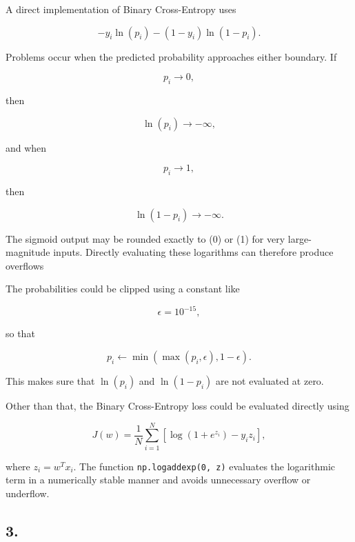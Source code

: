 \documentclass[11pt]{article}
\begin{document}
    A direct implementation of Binary Cross-Entropy uses

\[
-y_i\ln(p_i)-(1-y_i)\ln(1-p_i).
\]

Problems occur when the predicted probability approaches either
boundary. If

\[
p_i\rightarrow0,
\]

then

\[
\ln(p_i)\rightarrow-\infty,
\]

and when

\[
p_i\rightarrow1,
\]

then

\[
\ln(1-p_i)\rightarrow-\infty.
\]

The sigmoid output may be rounded exactly to (0) or (1) for very
large-magnitude inputs. Directly evaluating these logarithms can
therefore produce overflows

The probabilities could be clipped using a constant like

\[
\epsilon=10^{-15},
\]

so that

\[
p_i
\leftarrow
\min\left(
\max(p_i,\epsilon),
1-\epsilon
\right).
\]

This makes sure that \(\ln(p_i)\) and \(\ln(1-p_i)\) are not evaluated
at zero.

Other than that, the Binary Cross-Entropy loss could be evaluated
directly using

\[
J(w)
=
\frac{1}{N}
\sum_{i=1}^{N}
\left[
\log(1+e^{z_i})-y_i z_i
\right],
\]

where \(z_i=w^Tx_i\). The function \texttt{np.logaddexp(0,\ z)}
evaluates the logarithmic term in a numerically stable manner and avoids
unnecessary overflow or underflow.

    \subsection{3.}
\end{document}
